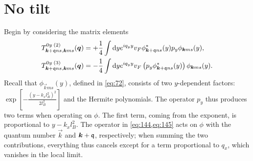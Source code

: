 \section{No tilt}\label{sec:otherstressterm:notilt}
Begin by considering the matrix elements
\begin{align}
  \label{eq:144}
  T ^{0y\; (2)} _{\bm{k}+\mathfrak{q}ns, \bm{k}ms} (\bm{q}) &= +
                                                            \frac{1}{4}
                                                            \int \mathrm{d}y
                                                            e^{iq_y y} v_F
                                                            \phi ^{*}_{\bm{k}+\mathfrak{q} ns}(y)
                                                            p_y \phi _{\bm{k}ms} (y),\\
  \label{eq:145}
  T ^{0y\; (3)} _{\bm{k}+\mathfrak{q}ns, \bm{k}ms} (\bm{q}) &= -
                                                            \frac{1}{4}
                                                            \int \mathrm{d}y
                                                            e^{iq_y y} v_F
                                                            \left( p_y\phi ^{*}_{\bm{k}+\mathfrak{q} ns}(y) \right)
                                                            \phi _{\bm{k}ms}(y).
\end{align}
Recall that $\phi_{\vec{k}ms} (y)$, defined in \cref{eq:72}, consists of two $y$-dependent factors:
\(
  \exp \left[-\frac{(y-k_x l_B^2)^2}{2 l_{B}^2 } \right]
\)
and the Hermite polynomials.
The operator $p_y$ thus produces two terms when operating on $\phi $.
The first term, coming from the exponent, is proportional to $y-k_xl_B^2$.
The operator in \cref{eq:144,eq:145} acts on $\phi $ with the quantum  number $\vec{k}$ and $\bm{k} + \mathfrak{q}$, respectively;
when summing the two contributions, everything thus cancels except for a term proportional to $q_x$, which vanishes in the local limit.

